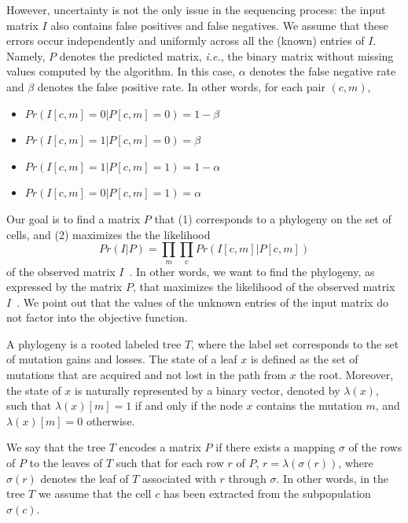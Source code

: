 \documentclass[a4paper,USenglish]{article}
\newcommand{\ie}{\emph{i.e.}}
\theoremstyle{definition}
\begin{document}
However, uncertainty is not the only issue in the sequencing process:
the input matrix $I$ also contains false positives and false
negatives.  We assume that these errors occur independently and
uniformly across all the (known) entries of $I$.  Namely, $P$ denotes
the predicted matrix, \ie, the binary matrix without missing values
computed by the algorithm.  In this case, $\alpha$ denotes the false
negative rate and $\beta$ denotes the false positive rate.  In other
words, for each pair $(c,m)$,
\begin{itemize}
\item $Pr(I[c,m] = 0|P[c,m] = 0) = 1- \beta$
\item $Pr(I[c,m] = 1|P[c,m] = 0) = \beta$
\item $Pr(I[c,m] = 1|P[c,m] = 1) = 1- \alpha$
\item $Pr(I[c,m] = 0|P[c,m] = 1) = \alpha$
\end{itemize}

Our goal is to find a matrix $P$ that (1) corresponds to a phylogeny
on the set of cells, and (2) maximizes the the likelihood
$$
Pr(I|P) = \prod_{m} \prod_{c} Pr(I[c,m] | P[c,m])
$$
of the observed matrix $I$~\cite{Jahn2016}.  In other words, we want
to find the phylogeny, as expressed by the matrix $P$, that maximizes
the likelihood of the observed matrix $I$~\cite{Jahn2016}.  We point
out that the values of the unknown entries of the input matrix do not
factor into the objective function.

A phylogeny is a rooted labeled tree $T$, where the label set
corresponds to the set of mutation gains and losses.  The state of a
leaf $x$ is defined as the set of mutations that are acquired and not
lost in the path from $x$ the root.  Moreover, the state of $x$ is
naturally represented by a binary vector, denoted by $\lambda(x)$,
such that $\lambda(x)[m]=1$ if and only if the node $x$ contains the
mutation $m$, and $\lambda(x)[m]=0$ otherwise.

We say that the tree $T$ encodes a matrix $P$ if there exists a
mapping $\sigma$ of the rows of $P$ to the leaves of $T$ such that for
each row $r$ of $P$, $r=\lambda(\sigma(r))$, where $\sigma(r)$ denotes
the leaf of $T$ associated with $r$ through $\sigma$.  In other words,
in the tree $T$ we assume that the cell $c$ has been extracted from
the subpopulation $\sigma(c)$.
\end{document}

